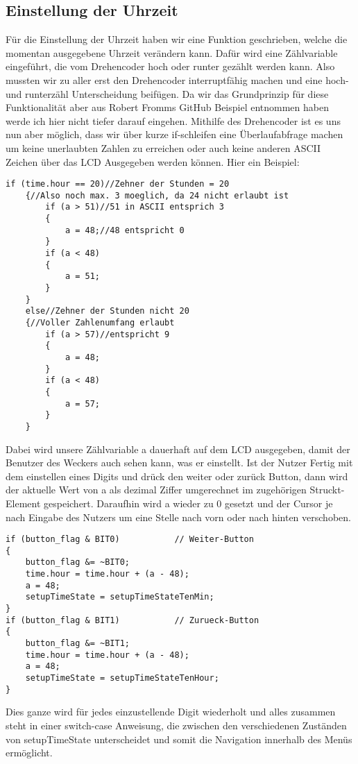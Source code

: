 \documentclass[openright,twoside,12pt,a4paper]{scrartcl}
\begin{document}
\begin{flushleft}
		 \subsection{Einstellung der Uhrzeit}
	 	Für die Einstellung der Uhrzeit haben wir eine Funktion geschrieben, welche die momentan ausgegebene Uhrzeit verändern kann. Dafür wird eine Zählvariable eingeführt, die vom Drehencoder hoch oder runter gezählt werden kann. Also mussten wir zu aller erst den Drehencoder interruptfähig machen und eine hoch- und runterzähl Unterscheidung beifügen. Da wir das Grundprinzip für diese Funktionalität aber aus Robert Fromms GitHub Beispiel entnommen haben werde ich hier nicht tiefer darauf eingehen. Mithilfe des Drehencoder ist es uns nun aber möglich, dass wir über kurze if-schleifen eine Überlaufabfrage machen um keine unerlaubten Zahlen zu erreichen oder auch keine anderen ASCII Zeichen über das LCD Ausgegeben werden können. Hier ein Beispiel:
	 	\begin{lstlisting}
if (time.hour == 20)//Zehner der Stunden = 20
	{//Also noch max. 3 moeglich, da 24 nicht erlaubt ist
		if (a > 51)//51 in ASCII entsprich 3
		{
			a = 48;//48 entspricht 0
		}
		if (a < 48)
		{
			a = 51;
		}
	}
	else//Zehner der Stunden nicht 20
	{//Voller Zahlenumfang erlaubt
		if (a > 57)//entspricht 9
		{
			a = 48;
		}
		if (a < 48)
		{
			a = 57;
		}
	}
	 	\end{lstlisting}
	 	Dabei wird unsere Zählvariable a dauerhaft auf dem LCD ausgegeben, damit der Benutzer des Weckers auch sehen kann, was er einstellt. Ist der Nutzer Fertig mit dem einstellen eines Digits und drück den weiter oder zurück Button, dann wird der aktuelle Wert von a als dezimal Ziffer umgerechnet im zugehörigen Struckt-Element gespeichert. Daraufhin wird a wieder zu 0 gesetzt und der Cursor je nach Eingabe des Nutzers um eine Stelle nach vorn oder nach hinten verschoben.
	 	\begin{lstlisting}
if (button_flag & BIT0)           // Weiter-Button
{
	button_flag &= ~BIT0;
	time.hour = time.hour + (a - 48);
	a = 48;
	setupTimeState = setupTimeStateTenMin;
}
if (button_flag & BIT1)           // Zurueck-Button
{
	button_flag &= ~BIT1;
	time.hour = time.hour + (a - 48);
	a = 48;
	setupTimeState = setupTimeStateTenHour;
}
	 	\end{lstlisting}
	 	Dies ganze wird für jedes einzustellende Digit wiederholt und alles zusammen steht in einer switch-case Anweisung, die zwischen den verschiedenen Zuständen von setupTimeState unterscheidet und somit die Navigation innerhalb des Menüs ermöglicht. \\

\end{flushleft}
\end{document}
